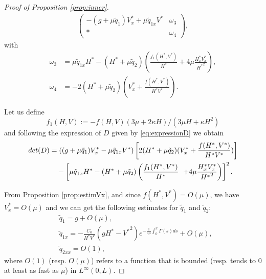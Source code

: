 \documentclass[11pt]{article}
\begin{document}
\begin{proof}[Proof of Proposition \ref{prop:inner}]
{\begin{equation}
\begin{split}
\begin{pmatrix}
          -(g+\mu \tilde{q}_{1}){V^{*}_{x}} +\mu\tilde{q}_{1x}{V^{*}} & \omega_3 \\
      \ast & \omega_4
    \end{pmatrix},
    \end{split}
\end{equation}
with
\begin{align}
    \omega_3 &=  \mu\tilde{q}_{1x}{H^{*}}
          -({H^{*}}+\mu \tilde{q}_{2})\left(\frac{f_{1}({H^{*}},{V^{*}})}{{H^{*}}}+4\mu \frac{{H^{*}_{x}}{V^{*}_{x}}}{{H^{*}}^{2}}\right), \\
    \omega_4 &= -{ 2} ({H^{*}}+\mu \tilde{q}_{2})\left({V^{*}_{x}}+\frac{f({H^{*}},{V^{*}})}{H^{*}V^{*}}\right).
\end{align}
}

Let us define 
\begin{equation}
    f_{1}(H,V) := -f(H,V)(3\mu+2\kappa H)/(3\mu H+\kappa H^{2})
\end{equation} and following the expression of $D$ given by \eqref{eq:expressionD} 
we obtain
\begin{equation}
\label{eq:estimdetD0}
\begin{split}
&det(D) =  \left((g+\mu \tilde{q}_{1}){V^{*}_{x}} -\mu\tilde{q}_{1x}{V^{*}} \right) \left[
{2}({H^{*}}+\mu \tilde{q}_{2})({V^{*}_{x}}+\frac{f({H^{*}},{V^{*}})}{{{H^{*}}V^{*}}})
\vphantom{\frac{f}{4}}\right]   \\
& \quad\quad\quad\quad-\left[\mu\tilde{q}_{1x}{H^{*}}
          -({H^{*}}+\mu \tilde{q}_{2})\left(\frac{f_{1}({H^{*}},{V^{*}})}{{H^{*}}}\right.\right. \left.\left.+4\mu \frac{{H^{*}_{x}}{V^{*}_{x}}}{{H^{*}}^{2}}\right)\right]^{2}.
\end{split}
\end{equation}

From Proposition \ref{prop:estimVx}, and since $f(H^{*}, V^{*}) = O(\mu)$, we have $V^{*}_{x} = O(\mu)$ and we can get the following estimates for $\tilde{q}_{1}$ and $\tilde{q}_{2}$:
\begin{equation}
\label{eq:estimq1q2}
\begin{split}
&\tilde{q}_{1} = g+O(\mu),\\
&\tilde{q}_{1x} = {-\frac{C_{0}}{H^{*}V^{*}}\left(g H^{*}-{V^{*}}^{2}\right)e^{-\frac{1}{4\mu}\int_{0}^{x}{\Gamma(s)}ds}} +O(\mu),\\
&\tilde{q}_{2xx} = O(1),
\end{split}
\end{equation}
 where $O(1)$ (resp. $O(\mu)$) refers to a function that is bounded (resp. tends to 0 at least as fast as $\mu$) in $L^{\infty}(0,L)$.


\end{proof}
\end{document}
